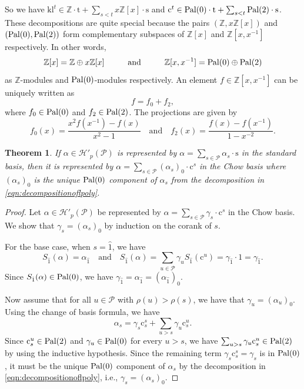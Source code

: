 \documentclass[12pt,letterpaper,english]{amsart}
\theoremstyle{teoremas}
\newtheorem{theorem}{Theorem}[section]
\theoremstyle{definition}
\newcommand{\cH}{\mathcal{H}}
\newcommand{\calP}{\mathcal{P}}
\newcommand{\ZZ}{\mathbb{Z}}
\newcommand{\Ebasis}[1]{\mathrm{#1}}
\newcommand{\Cbasis}[1]{\mathrm{c}^{#1}}
\newcommand{\CbasisSub}[2]{\mathrm{c}^{#1}_{#2}}
\newcommand{\klbasis}[1]{\mathrm{kl}^{#1}}
\newcommand{\pal}{\normalfont\text{Pal}}
\begin{document}
So we have
\(\klbasis{t}\in \ZZ\cdot \Ebasis{t} + \sum_{s<t}{x\ZZ[x]\cdot\Ebasis{s}}\) and
\(\Cbasis{t}\in \pal(0)\cdot \Ebasis{t} + \sum_{s<t}{\pal(2)\cdot\Ebasis{s}}\).
These decompositions are quite special because the pairs \((\ZZ, x\ZZ[x])\)
and \((\pal(0), \pal(2))\) form complementary subspaces of \(\ZZ[x]\) and
\(\ZZ[x,x^{-1}]\) respectively. In other words,
\[\ZZ[x] = \ZZ \oplus x\ZZ[x]\hspace{10mm}\text{and}\hspace{10mm}\ZZ[x,x^{-1}]
    = \pal(0)\oplus\pal(2)\]
as \(\ZZ\)-modules and \(\pal(0)\)-modules respectively. An element
\(f\in\ZZ[x, x^{-1}]\) can be uniquely written as
\begin{equation} \label{eqn:decompositionoflpoly}
    f = f_0 + f_2,
\end{equation}
where \(f_0\in\pal(0)\) and \(f_2\in\pal(2)\). The projections are given by
\[ f_0(x) = \frac{x^2 f(x^{-1}) - f(x)}{x^2 - 1} \quad \text{and} \quad f_2(x) = \frac{f(x) - f(x^{-1})}{1 - x^{-2}}. \]

\begin{theorem}
    \label{thm:changeofbasis}
    If \(\alpha\in\cH'_p(\calP)\) is represented by
    \(\alpha = \sum_{s\in\calP}{\alpha_s\cdot\Ebasis{s}}\) in the standard basis,
    then it is represented by
    \(\alpha = \sum_{s\in\calP}{(\alpha_s)_0}\cdot\Cbasis{s}\) in the Chow basis
    where \((\alpha_s)_0\) is the unique \(\pal(0)\) component of \(\alpha_s\)
    from the decomposition in \ref{eqn:decompositionoflpoly}.
\end{theorem}
\begin{proof}
    Let \(\alpha\in\cH'_p(\calP)\) be represented by
    \(\alpha = \sum_{s\in\calP}{\gamma_s\cdot\Cbasis{s}}\) in the Chow basis.
    We show that \(\gamma_s = (\alpha_s)_0\) by induction on the corank of \(s\).

    For the base case, when \(s=\hat{1}\), we have
    \[S_{\hat{1}}(\alpha) = \alpha_{\hat{1}}\quad\text{and}\quad S_{\hat{1}}(\alpha) = \sum_{u \in \calP} \gamma_u S_{\hat{1}}(\Cbasis{u})= \gamma_{\hat{1}} \cdot 1 = \gamma_{\hat{1}}.\]
    Since \(S_{\hat{1}}(\alpha)\in\pal(0)\), we have \(\gamma_{\hat{1}} = \alpha_{\hat{1}} = (\alpha_{\hat{1}})_0\).

    Now assume that for all \(u\in\calP\) with \(\rho(u) > \rho(s)\), we have that \(\gamma_u = (\alpha_u)_0\).
    Using the change of basis formula, we have
    \[\alpha_s = \gamma_s \CbasisSub{s}{s} + \sum_{u > s}{\gamma_u \CbasisSub{u}{s}}.\]
    Since \(\CbasisSub{u}{s} \in \pal(2)\) and \(\gamma_u \in \pal(0)\)
    for every \(u > s\),
    we have \(\sum_{u > s}{\gamma_u \CbasisSub{u}{s}} \in \pal(2)\) by using
    the inductive hypothesis.
    Since the remaining term \(\gamma_s \CbasisSub{s}{s}= \gamma_s\) is in \(\pal(0)\),
    it must be the unique \(\pal(0)\) component of \(\alpha_s\)
    by the decomposition in \ref{eqn:decompositionoflpoly}, i.e., \(\gamma_s = (\alpha_s)_0\).
\end{proof}
\end{document}
